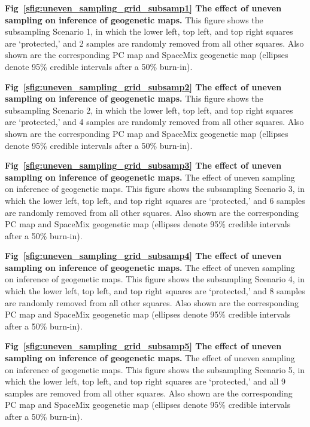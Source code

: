 \documentclass[10pt,letterpaper]{article}
\begin{document}
\label{sfig:uneven_sampling_grid_subsamp1}
{\bf{Fig\ \ref{sfig:uneven_sampling_grid_subsamp1}}
	The effect of uneven sampling on inference of geogenetic maps.}
	This figure shows the subsampling Scenario 1, 
	in which the lower left, top left, and top right squares are `protected,'
	and 2 samples are randomly removed from all other squares.
	Also shown are the corresponding PC map and 
	SpaceMix geogenetic map 
	(ellipses denote 95\% credible intervals after a 50\% burn-in).
			
\label{sfig:uneven_sampling_grid_subsamp2}
{\bf{Fig\ \ref{sfig:uneven_sampling_grid_subsamp2}}
	The effect of uneven sampling on inference of geogenetic maps.}
	This figure shows the subsampling Scenario 2, 
	in which the lower left, top left, and top right squares are `protected,'
	and 4 samples are randomly removed from all other squares.
	Also shown are the corresponding PC map and 
	SpaceMix geogenetic map 
	(ellipses denote 95\% credible intervals after a 50\% burn-in).
			
\label{sfig:uneven_sampling_grid_subsamp3}
{\bf{Fig\ \ref{sfig:uneven_sampling_grid_subsamp3}}
	The effect of uneven sampling on inference of geogenetic maps.}
	The effect of uneven sampling on inference of geogenetic maps.  
	This figure shows the subsampling Scenario 3, 
	in which the lower left, top left, and top right squares are `protected,'
	and 6 samples are randomly removed from all other squares.
	Also shown are the corresponding PC map and 
	SpaceMix geogenetic map 
	(ellipses denote 95\% credible intervals after a 50\% burn-in).
	
\label{sfig:uneven_sampling_grid_subsamp4}
{\bf{Fig\ \ref{sfig:uneven_sampling_grid_subsamp4}}
	The effect of uneven sampling on inference of geogenetic maps.}
	The effect of uneven sampling on inference of geogenetic maps.  
	This figure shows the subsampling Scenario 4, 
	in which the lower left, top left, and top right squares are `protected,'
	and 8 samples are randomly removed from all other squares.
	Also shown are the corresponding PC map and 
	SpaceMix geogenetic map 
	(ellipses denote 95\% credible intervals after a 50\% burn-in).
			
\label{sfig:uneven_sampling_grid_subsamp5}
{\bf{Fig\ \ref{sfig:uneven_sampling_grid_subsamp5}}
	The effect of uneven sampling on inference of geogenetic maps.}
	The effect of uneven sampling on inference of geogenetic maps.  
	This figure shows the subsampling Scenario 5, 
	in which the lower left, top left, and top right squares are `protected,'
	and all 9 samples are removed from all other squares.
	Also shown are the corresponding PC map and 
	SpaceMix geogenetic map 
	(ellipses denote 95\% credible intervals after a 50\% burn-in).
			
\end{document}
